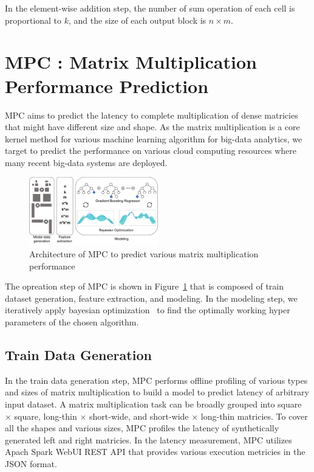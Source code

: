 \documentclass[10pt, conference, compsocconf]{IEEEtran}
\begin{document}
In the element-wise addition step, the number of sum operation of each cell is proportional to $k$, and the size of each output block is $n \times m$.

\section{MPC : Matrix Multiplication Performance Prediction}
MPC aims to predict the latency to complete multiplication of dense matricies that might have different size and shape. As the matrix multiplication is a core kernel method for various machine learning algorithm for big-data analytics, we target to predict the performance on various cloud computing resources where many recent big-data systems are deployed.

\begin{figure}
  \centering\includegraphics[width=0.5\textwidth]{figures/mpc-architecture.pdf}\caption{Architecture of MPC to predict various matrix multiplication performance}\label{fig:mpc-architecture}
\end{figure}

The opreation step of MPC is shown in Figure~\ref{fig:mpc-architecture} that is composed of train dataset generation, feature extraction, and modeling. In the modeling step, we iteratively apply bayesian optimization~\cite{bayesian-optimization} to find the optimally working hyper parameters of the chosen algorithm.

\subsection{Train Data Generation}
In the train data generation step, MPC performs offline profiling of various types and sizes of matrix multiplication to build a model to predict latency of arbitrary input dataset. A matrix multiplication task can be broadly grouped into square $\times$ square, long-thin $\times$ short-wide, and short-wide $\times$ long-thin matricies. To cover all the shapes and various sizes, MPC profiles the latency of synthetically generated left and right matricies. In the latency measurement, MPC utilizes Apach Spark WebUI REST API that provides various execution metricies in the JSON format.
\end{document}
